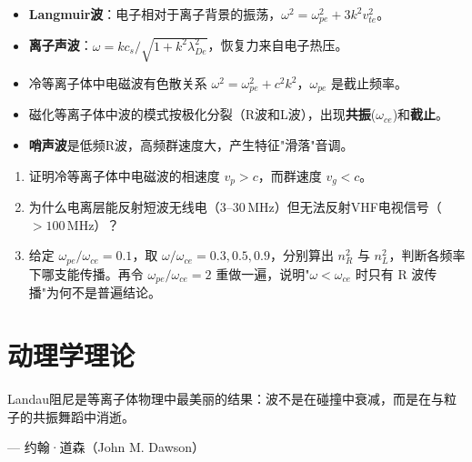 \documentclass[12pt,a4paper,openany,oneside]{book}
\begin{document}
\begin{chapterreview}
\begin{itemize}
\item \textbf{Langmuir波}：电子相对于离子背景的振荡，$\omega^2 = \omega_{pe}^2 + 3k^2v_{te}^2$。
\item \textbf{离子声波}：$\omega = kc_s/\sqrt{1+k^2\lambda_{De}^2}$，恢复力来自电子热压。
\item 冷等离子体中电磁波有色散关系 $\omega^2 = \omega_{pe}^2 + c^2k^2$，$\omega_{pe}$ 是截止频率。
\item 磁化等离子体中波的模式按极化分裂（R波和L波），出现\textbf{共振}($\omega_{ce}$)和\textbf{截止}。
\item \textbf{哨声波}是低频R波，高频群速度大，产生特征"滑落"音调。
\end{itemize}
\end{chapterreview}

\begin{miniquiz}
\begin{enumerate}
\item 证明冷等离子体中电磁波的相速度 $v_p > c$，而群速度 $v_g < c$。
\item 为什么电离层能反射短波无线电（$3$--$30\,\mathrm{MHz}$）但无法反射VHF电视信号（$>100\,\mathrm{MHz}$）？
\item 给定 $\omega_{pe}/\omega_{ce}=0.1$，取 $\omega/\omega_{ce}=0.3,0.5,0.9$，分别算出 $n_R^2$ 与 $n_L^2$，判断各频率下哪支能传播。再令 $\omega_{pe}/\omega_{ce}=2$ 重做一遍，说明"$\omega<\omega_{ce}$ 时只有 R 波传播"为何不是普遍结论。
\end{enumerate}
\end{miniquiz}




\chapter{动理学理论}\label{ch:7}
\epigraph{Landau阻尼是等离子体物理中最美丽的结果：波不是在碰撞中衰减，而是在与粒子的共振舞蹈中消逝。}{--- 约翰·道森（John M. Dawson）}
\end{document}
